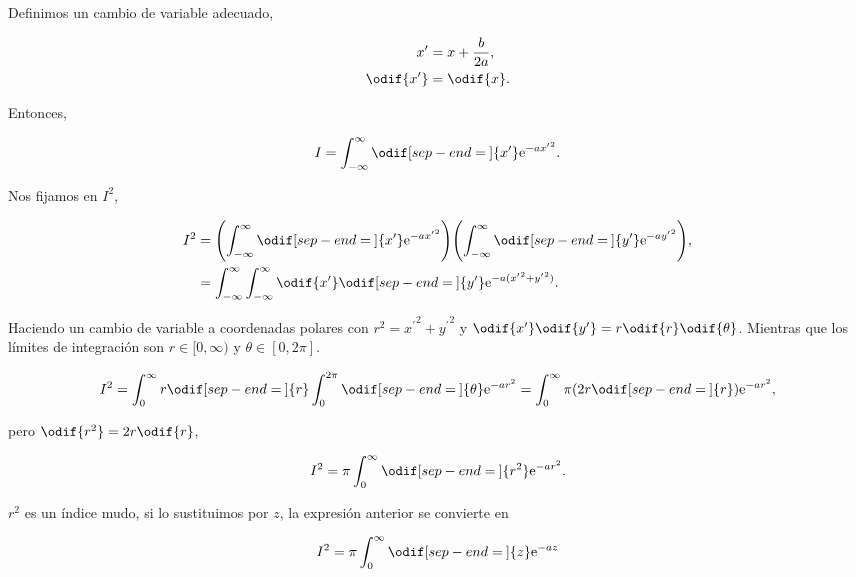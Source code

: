 \documentclass[../main.tex]{subfiles}
\begin{document}
\begin{problema}
	\pagebreak
	Definimos un cambio de variable adecuado,

	\begin{align*}
		x^{\prime}        & = x + \dfrac{b}{2a}, \\
		\odif{x^{\prime}} & = \odif{x}.
	\end{align*}

	Entonces,

	\begin{equation*}
		I = \int_{-\infty}^{\infty}\odif[sep-end=\medspace]{x^{\prime}}\mathrm{e}^{-a{x^{\prime}}^{2}}.
	\end{equation*}

	Nos fijamos en \(I^{2}\),

	\begin{align*}
		I^{2} & = \Biggl(\int_{-\infty}^{\infty}\odif[sep-end=\medspace]{x^{\prime}}\mathrm{e}^{-a{x^{\prime}}^{2}}\Biggr)\Biggl(\int_{-\infty}^{\infty}\odif[sep-end=\medspace]{y^{\prime}}\mathrm{e}^{-a{y^{\prime}}^{2}}\Biggr), \\
		      & = \int_{-\infty}^{\infty}\int_{-\infty}^{\infty}\odif{x^{\prime}}\odif[sep-end=\medspace]{y^{\prime}} \mathrm{e}^{-a({x^{\prime}}^{2} + {y^{\prime}}^{2})}.
	\end{align*}

	Haciendo un cambio de variable a coordenadas polares con
	\(r^{2} = {x^{\prime}}^{2} + {y^{\prime}}^{2}\) y
	\(\odif{x^{\prime}}\odif{y^{\prime}} = r \odif{r}\odif{\theta}\).
	Mientras que los límites de integración son
	\( r\in[0,\infty)\) y \(\theta\in[0,2\pi]\).

	\begin{equation*}
		I^{2} = \int_{0}^{\infty}r\odif[sep-end=\medspace]{r} \int_{0}^{2\pi}\odif[sep-end=\medspace]{\theta} \mathrm{e}^{-ar^{2}} = \int_{0}^{\infty}\pi(2r\odif[sep-end=\medspace]{r}) \mathrm{e}^{-ar^{2}},
	\end{equation*}

	pero \(\odif{r^{2}} = 2r \odif{r}\),

	\begin{equation*}
		I^{2} = \pi \int_{0}^{\infty}\odif[sep-end=\medspace]{r^{2}} \mathrm{e}^{-ar^{2}}.
	\end{equation*}

	\(r^{2}\) es un índice mudo, si lo sustituimos por \(z\), la expresión
	anterior se convierte en

	\begin{equation*}
		I^{2} = \pi \int_{0}^{\infty}\odif[sep-end=\medspace]{z} \mathrm{e}^{-az}
	\end{equation*}


\end{problema}
\end{document}
